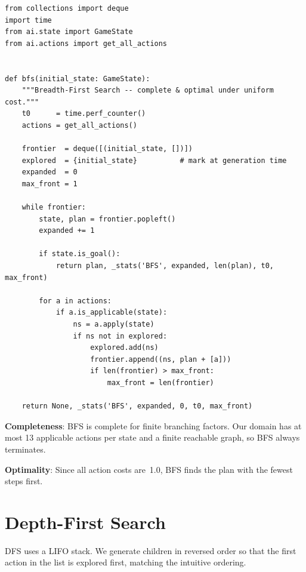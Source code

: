 \documentclass[12pt, a4paper]{report}
\begin{document}
\begin{lstlisting}[style=pyStyle,
  caption={BFS implementation (\texttt{ai/algorithms/bfs.py}).},
  label=lst:bfs]
from collections import deque
import time
from ai.state import GameState
from ai.actions import get_all_actions


def bfs(initial_state: GameState):
    """Breadth-First Search -- complete & optimal under uniform cost."""
    t0      = time.perf_counter()
    actions = get_all_actions()

    frontier  = deque([(initial_state, [])])
    explored  = {initial_state}          # mark at generation time
    expanded  = 0
    max_front = 1

    while frontier:
        state, plan = frontier.popleft()
        expanded += 1

        if state.is_goal():
            return plan, _stats('BFS', expanded, len(plan), t0, max_front)

        for a in actions:
            if a.is_applicable(state):
                ns = a.apply(state)
                if ns not in explored:
                    explored.add(ns)
                    frontier.append((ns, plan + [a]))
                    if len(frontier) > max_front:
                        max_front = len(frontier)

    return None, _stats('BFS', expanded, 0, t0, max_front)
\end{lstlisting}

\textbf{Completeness}: BFS is complete for finite branching factors.  Our
domain has at most 13 applicable actions per state and a finite reachable
graph, so BFS always terminates.

\textbf{Optimality}: Since all action costs are~1.0, BFS finds the plan with
the fewest steps first.

\section{Depth-First Search}
\label{sec:dfs}

DFS uses a LIFO stack.  We generate children in reversed order so that the
first action in the list is explored first, matching the intuitive ordering.
\end{document}
